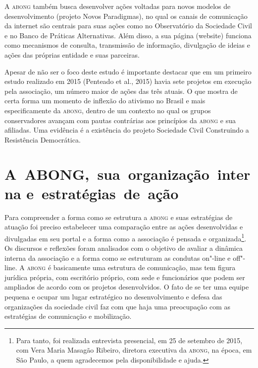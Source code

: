 A \textsc{abong} também busca desenvolver ações voltadas para novos modelos de
desenvolvimento (projeto Novos Paradigmas), no qual os canais de
comunicação da internet são centrais para suas ações como no
Observatório da Sociedade Civil e no Banco de Práticas Alternativas.
Além disso, a sua página (website) funciona como mecanismos de consulta,
transmissão de informação, divulgação de ideias e ações das próprias
entidade e suas parceiras.

Apesar de não ser o foco deste estudo é importante destacar que em um
primeiro estudo realizado em 2015 (Penteado et al., 2015) havia sete
projetos em execução pela associação, um número maior de ações das três
atuais. O que mostra de certa forma um momento de inflexão do ativismo
no Brasil e mais especificamente da \textsc{abong}, dentro de um contexto no qual
os grupos conservadores avançam com pautas contrárias aos princípios da
\textsc{abong} e sua afiliadas. Uma evidência é a existência do projeto Sociedade
Civil Construindo a Resistência Democrática.

\section{A~ABONG,~sua~organização~interna e~estratégias~de~ação}

Para compreender a forma como se estrutura a \textsc{abong} e suas estratégias de
atuação foi preciso estabelecer uma comparação entre as ações
desenvolvidas e divulgadas em seu portal e a forma como a associação é
pensada e organizada\footnote{Para tanto, foi realizada entrevista
  presencial, em 25 de setembro de 2015, com Vera Maria Masagão Ribeiro,
  diretora executiva da \textsc{abong}, na época, em São Paulo, a quem
  agradecemos pela disponibilidade e ajuda.}. Os discursos e reflexões
foram analisados com o objetivo de avaliar a dinâmica interna da
associação e a forma como se estruturam as condutas on"-line e off"-line.
A \textsc{abong} é basicamente uma estrutura de comunicação, mas tem figura
jurídica própria, com escritório próprio, com sede e funcionários que
podem ser ampliados de acordo com os projetos desenvolvidos. O fato de
se ter uma equipe pequena e ocupar um lugar estratégico no
desenvolvimento e defesa das organizações da sociedade civil faz com que
haja uma preocupação com as estratégias de comunicação e mobilização.

